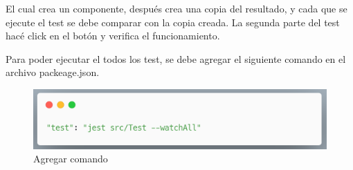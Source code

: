 El cual crea un componente, después crea una copia del resultado, y cada que se ejecute el test se debe comparar con la copia creada.
La segunda parte del test hacé click en el botón y verifica el funcionamiento.

Para poder ejecutar el todos los test, se debe agregar el siguiente comando en el archivo packeage.json.
 \newline
\begin{figure}[H]
    \includegraphics[width=1\textwidth]{./Imagenes/8.42t.png}
    \caption[Agregar comando]{Agregar comando}
    \end{figure}
\newline
\clearpage
